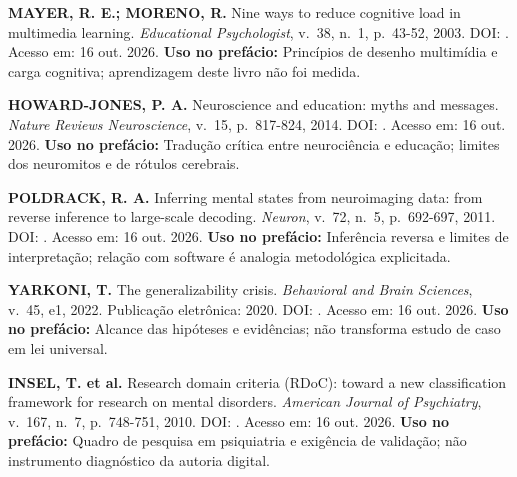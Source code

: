 \begin{referencia}
\textbf{MAYER, R. E.; MORENO, R.} Nine ways to reduce cognitive load in multimedia learning. \emph{Educational Psychologist}, v.~38, n.~1, p.~43-52, 2003. DOI: \href{https://doi.org/10.1207/S15326985EP3801_6}{}. Acesso em: 16 out. 2026.
\textbf{Uso no prefácio:} Princípios de desenho multimídia e carga cognitiva; aprendizagem deste livro não foi medida.
\end{referencia}

\begin{referencia}
\textbf{HOWARD-JONES, P. A.} Neuroscience and education: myths and messages. \emph{Nature Reviews Neuroscience}, v.~15, p.~817-824, 2014. DOI: \href{https://doi.org/10.1038/nrn3817}{}. Acesso em: 16 out. 2026.
\textbf{Uso no prefácio:} Tradução crítica entre neurociência e educação; limites dos neuromitos e de rótulos cerebrais.
\end{referencia}

\begin{referencia}
\textbf{POLDRACK, R. A.} Inferring mental states from neuroimaging data: from reverse inference to large-scale decoding. \emph{Neuron}, v.~72, n.~5, p.~692-697, 2011. DOI: \href{https://doi.org/10.1016/j.neuron.2011.11.001}{}. Acesso em: 16 out. 2026.
\textbf{Uso no prefácio:} Inferência reversa e limites de interpretação; relação com software é analogia metodológica explicitada.
\end{referencia}

\begin{referencia}
\textbf{YARKONI, T.} The generalizability crisis. \emph{Behavioral and Brain Sciences}, v.~45, e1, 2022. Publicação eletrônica: 2020. DOI: \href{https://doi.org/10.1017/S0140525X20001685}{}. Acesso em: 16 out. 2026.
\textbf{Uso no prefácio:} Alcance das hipóteses e evidências; não transforma estudo de caso em lei universal.
\end{referencia}

\begin{referencia}
\textbf{INSEL, T. et al.} Research domain criteria (RDoC): toward a new classification framework for research on mental disorders. \emph{American Journal of Psychiatry}, v.~167, n.~7, p.~748-751, 2010. DOI: \href{https://doi.org/10.1176/appi.ajp.2010.09091379}{}. Acesso em: 16 out. 2026.
\textbf{Uso no prefácio:} Quadro de pesquisa em psiquiatria e exigência de validação; não instrumento diagnóstico da autoria digital.
\end{referencia}

